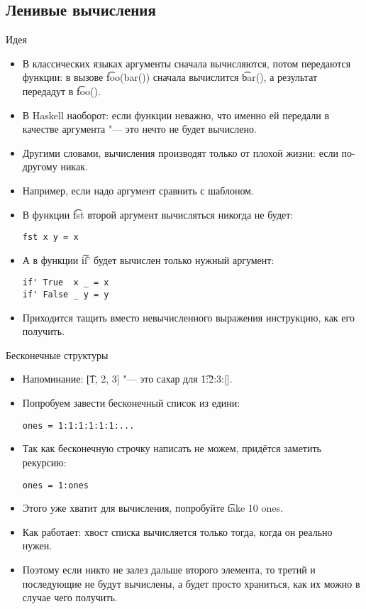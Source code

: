 \subsection{Ленивые вычисления}

\begin{frame}
\end{frame}

\begin{frame}[fragile]{Идея}
	\begin{itemize}
		\item В классических языках аргументы сначала вычисляются, потом передаются функции: в вызове \t{foo(bar())} сначала вычислится \t{bar()}, а результат передадут в \t{foo()}.
		\item В Haskell наоборот: если функции неважно, что именно ей передали в качестве аргумента "--- это нечто не будет вычислено.
		\item Другими словами, вычисления производят только от плохой жизни: если по-другому никак.
		\item Например, если надо аргумент сравнить с шаблоном.
		\item В функции \t{fst} второй аргумент вычисляться никогда не будет:
\begin{verbatim}
fst x y = x
\end{verbatim}
		\item А в функции \t{if'} будет вычислен только нужный аргумент:
\begin{verbatim}
if' True  x _ = x
if' False _ y = y
\end{verbatim}
		\item Приходится тащить вместо невычисленного выражения инструкцию, как его получить.
	\end{itemize}
\end{frame}

\begin{frame}[fragile]{Бесконечные структуры}
	\begin{itemize}
		\item Напоминание: \t{[1, 2, 3]} "--- это сахар для \t{1:2:3:[]}.
		\item Попробуем завести бесконечный список из едини:
\begin{verbatim}
ones = 1:1:1:1:1:1:...
\end{verbatim}
		\item Так как бесконечную строчку написать не можем, придётся заметить рекурсию:
\begin{verbatim}
ones = 1:ones
\end{verbatim}
		\item Этого уже хватит для вычисления, попробуйте \t{take 10 ones}.
		\item Как работает: хвост списка вычисляется только тогда, когда он реально нужен.
		\item Поэтому если никто не залез дальше второго элемента, то третий и последующие не будут вычислены, а будет просто храниться, как их можно в случае чего получить.
	\end{itemize}
\end{frame}


